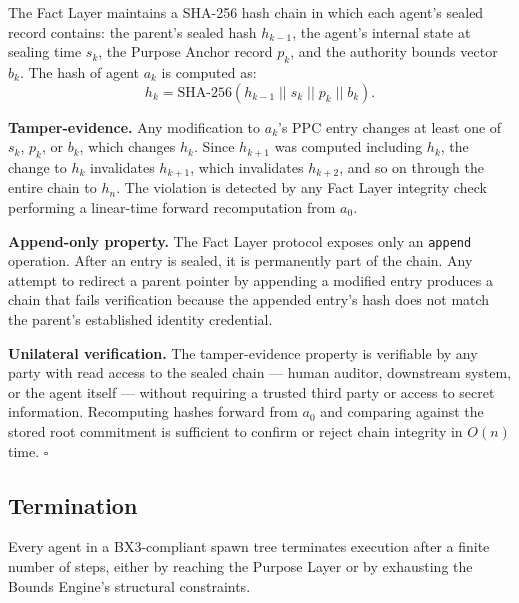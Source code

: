 \begin{Proof}
The Fact Layer maintains a SHA-256 hash chain in which each agent's sealed record contains: the parent's sealed hash $h_{k-1}$, the agent's internal state at sealing time $s_k$, the Purpose Anchor record $p_k$, and the authority bounds vector $b_k$. The hash of agent $a_k$ is computed as:
\begin{equation}
h_k = \mathrm{SHA\text{-}256}(h_{k-1} \;||\; s_k \;||\; p_k \;||\; b_k).
\label{eq:chain-hash-computation}
\end{equation}

\medskip
\noindent\textbf{Tamper-evidence.} Any modification to $a_k$'s PPC entry changes at least one of $s_k$, $p_k$, or $b_k$, which changes $h_k$. Since $h_{k+1}$ was computed including $h_k$, the change to $h_k$ invalidates $h_{k+1}$, which invalidates $h_{k+2}$, and so on through the entire chain to $h_n$. The violation is detected by any Fact Layer integrity check performing a linear-time forward recomputation from $a_0$.

\medskip
\noindent\textbf{Append-only property.} The Fact Layer protocol exposes only an \texttt{append} operation. After an entry is sealed, it is permanently part of the chain. Any attempt to redirect a parent pointer by appending a modified entry produces a chain that fails verification because the appended entry's hash does not match the parent's established identity credential.

\medskip
\noindent\textbf{Unilateral verification.} The tamper-evidence property is verifiable by any party with read access to the sealed chain — human auditor, downstream system, or the agent itself — without requiring a trusted third party or access to secret information. Recomputing hashes forward from $a_0$ and comparing against the stored root commitment is sufficient to confirm or reject chain integrity in $O(n)$ time. $\square$
\end{Proof}

\subsection{Termination}

\begin{property}[Termination]\label{prop:termination}
Every agent in a BX3-compliant spawn tree terminates execution after a finite number of steps, either by reaching the Purpose Layer or by exhausting the Bounds Engine's structural constraints.
\end{property}

